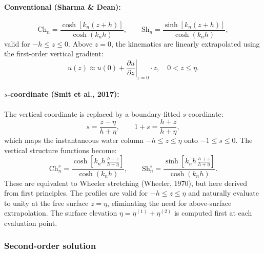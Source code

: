 \paragraph{Conventional (Sharma \& Dean):}
\begin{equation}\label{eq:conv_profiles}
    \mathrm{Ch}_n = \frac{\cosh[k_n(z+h)]}{\cosh(k_n h)}, \qquad
    \mathrm{Sh}_n = \frac{\sinh[k_n(z+h)]}{\cosh(k_n h)},
\end{equation}
valid for $-h \leq z \leq 0$. Above $z = 0$, the kinematics are linearly extrapolated using the first-order vertical gradient:
\begin{equation}
    u(z) \approx u(0) + \left.\frac{\partial u}{\partial z}\right|_{z=0} \cdot z, \quad 0 < z \leq \eta.
\end{equation}

\paragraph{$s$-coordinate (Smit et al., 2017):}
The vertical coordinate is replaced by a boundary-fitted $s$-coordinate:
\begin{equation}\label{eq:s_coord}
    s = \frac{z - \eta}{h + \eta}, \qquad 1 + s = \frac{h + z}{h + \eta},
\end{equation}
which maps the instantaneous water column $-h \leq z \leq \eta$ onto $-1 \leq s \leq 0$. The vertical structure functions become:
\begin{equation}\label{eq:wheeler_profiles}
    \mathrm{Ch}_n^s = \frac{\cosh\!\left[\displaystyle k_n h\,\frac{h + z}{h + \eta}\right]}{\cosh(k_n h)}, \qquad
    \mathrm{Sh}_n^s = \frac{\sinh\!\left[\displaystyle k_n h\,\frac{h + z}{h + \eta}\right]}{\cosh(k_n h)}.
\end{equation}
These are equivalent to Wheeler stretching (Wheeler, 1970), but here derived from first principles. The profiles are valid for $-h \leq z \leq \eta$ and naturally evaluate to unity at the free surface $z = \eta$, eliminating the need for above-surface extrapolation. The surface elevation $\eta = \eta^{(1)} + \eta^{(2)}$ is computed first at each evaluation point.

\subsubsection{Second-order solution}

